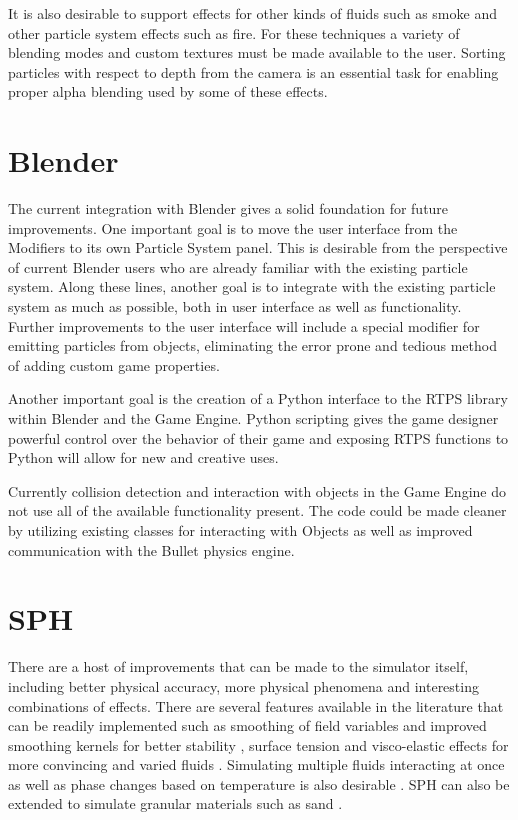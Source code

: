 It is also desirable to support effects for other kinds of fluids such as smoke
and other particle system effects such as fire. For these techniques a variety
of blending modes and custom textures must be made available to the user.
Sorting particles with respect to depth from the camera is an essential task
for enabling proper alpha blending used by some of these effects.

\section{Blender}

The current integration with Blender gives a solid foundation for future
improvements. One important goal is to move the user interface from the
Modifiers to its own Particle System panel. This is desirable from the
perspective of current Blender users who are already familiar with the existing
particle system. Along these lines, another goal is to integrate with the
existing particle system as much as possible, both in user interface as well as
functionality.
Further improvements to the user interface will include a special modifier for
emitting particles from objects, eliminating the error prone and tedious method
of adding custom game properties. 


Another important goal is the creation of a Python interface to the RTPS
library within Blender and the Game Engine. Python scripting gives the game
designer powerful control over the behavior of their game and exposing RTPS
functions to Python will allow for new and creative uses. 


Currently collision detection and interaction with objects in the Game Engine
do not use all of the available functionality present. The code could be made
cleaner by utilizing existing classes for interacting with Objects as well as
improved communication with the Bullet physics engine.  

\section{SPH}

There are a host of improvements that can be made to the simulator itself,
including better physical accuracy, more physical phenomena and interesting
combinations of effects.
There are several features available in the literature that can be readily
implemented such as smoothing of field variables and improved smoothing kernels for better
stability \cite{Liu2010}, surface tension and visco-elastic
effects for more convincing and varied fluids \cite{Clavet2005}. Simulating
multiple fluids interacting at once as well as phase changes based on
temperature is also desirable \cite{Muller2005}. SPH can also be extended to
simulate granular materials such as sand \cite{Bell2005}.


